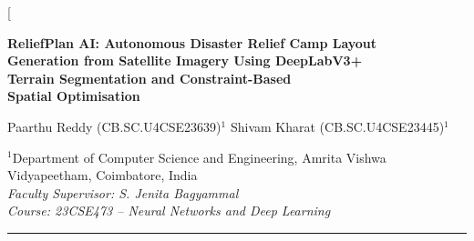 \documentclass[twocolumn]{article}
\begin{document}
\twocolumn[{%
\begin{@twocolumnfalse}

\begin{center}
  {\LARGE\bfseries
    ReliefPlan AI: Autonomous Disaster Relief Camp Layout\\[4pt]
    Generation from Satellite Imagery Using DeepLabV3+\\[4pt]
    Terrain Segmentation and Constraint-Based\\[4pt]
    Spatial Optimisation\par}

  \vspace{10pt}

  {\large
    Paarthu Reddy (CB.SC.U4CSE23639)$^{1}$\quad
    Shivam Kharat (CB.SC.U4CSE23445)$^{1}$
  \par}

  \vspace{6pt}

  {\normalsize
    $^{1}$Department of Computer Science and Engineering,
    Amrita Vishwa Vidyapeetham, Coimbatore, India\\[2pt]
    \textit{Faculty Supervisor: S. Jenita Bagyammal}\\
    \textit{Course: 23CSE473 -- Neural Networks and Deep Learning}
  \par}

  \vspace{10pt}
  \hrule
  \vspace{8pt}
\end{center}


\end{@twocolumnfalse}}
\end{document}
